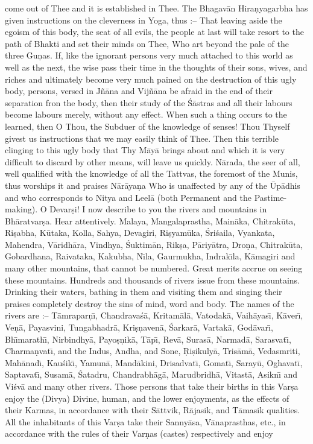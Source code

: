 come out of Thee and it is established in Thee. The Bhagav\=an Hira\d{n}yagarbha has given instructions on the cleverness in Yoga, thus :-- That leaving aside the egoism of this body, the seat of all evils, the people at last will take resort to the path of Bhakti and set their minds on Thee, Who art beyond the pale of the three Gu\d{n}as. If, like the ignorant persons very much attached to this world as well as the next, the wise pass their time in the thoughts of their sons, wives, and riches and ultimately become very much pained on the destruction of this ugly body, persons, versed in J\~n\=ana and Vij\~n\=ana be afraid in the end of their separation fron the body, then their study of the \'S\=astras and all their labours become labours merely, without any effect. When such a thing occurs to the learned, then O Thou, the Subduer of the knowledge of senses! Thou Thyself givest us instructions that we may easily think of Thee. Then this terrible clinging to this ugly body that Thy M\=ay\=a brings about and which it is very difficult to discard by other means, will leave us quickly. N\=arada, the seer of all, well qualified with the knowledge of all the Tattvas, the foremost of the Munis, thus worships it and praises N\=ar\=aya\d{n}a Who is unaffected by any of the \=Up\=adhis and who corresponds to Nitya and Leel\=a (both Permanent and the Pastime-making). O Devar\d{s}i! I now describe to you the rivers and mountains in Bh\=aratvar\d{s}a. Hear attentively. Malaya, Mangalaprastha, Main\=aka, Chitrak\=uta, Ri\d{s}abha, K\=utaka, Kolla, Sahya, Devagiri, Ri\d{s}yam\=uka, \'Sri\'saila, Vyankata, Mahendra, V\=aridh\=ara, Vindhya, \'Suktim\=an, Rik\d{s}a, P\=ariy\=atra, Dro\d{n}a, Chitrak\=uta, Gobardhana, Raivataka, Kakubha, N\={\i}la, Gaurmukha, Indrak\={\i}la, K\=amagiri and many other mountains, that cannot be numbered. Great merits accrue on seeing these mountains. Hundreds and thousands of rivers issue from these mountains. Drinking their waters, bathing in them and visiting them and singing their praises completely destroy the sins of mind, word and body. The names of the rivers are :-- T\=amrapar\d{n}\={\i}, Chandrava\'s\=a, Kritam\=al\=a, Vatodak\=a, Vaih\=ayas\={\i}, K\=aver\={\i}, Ve\d{n}\=a, Payasvini, Tungabhadr\=a, Kri\d{s}\d{n}aven\=a, \'Sarkar\=a, Vartak\=a, God\=avar\={\i}, Bh\={\i}marath\={\i}, Nirbindhy\=a, Payo\d{s}\d{n}ik\=a, T\=ap\={\i}, Rev\=a, Suras\=a, Narmad\=a, Sarasvat\={\i}, Charma\d{n}vat\={\i}, and the Indus, Andha, and Sone, \d{R}i\d{s}ikuly\=a, Tris\=am\=a, Vedasmriti, Mah\=anad\={\i}, Kau\'sik\={\i}, Yamun\=a, Mand\=akini, Drisadvat\={\i}, Gomat\={\i}, Saray\=u, Oghavat\={\i}, Saptavat\={\i}, Susam\=a, \'Satadru, Chandrabh\=ag\=a, Marudbridh\=a, Vitast\=a, Asikn\={\i} and Vi\'sv\=a and many other rivers. Those persons that take their births in this Var\d{s}a enjoy the (Divya) Divine, human, and the lower enjoyments, as the effects of their Karmas, in accordance with their S\=attvik, R\=ajasik, and T\=amasik qualities. All the inhabitants of this Var\d{s}a take their Sanny\=asa, V\=anaprasthas, etc., in accordance with the rules of their Var\d{n}as (castes) respectively and enjoy

